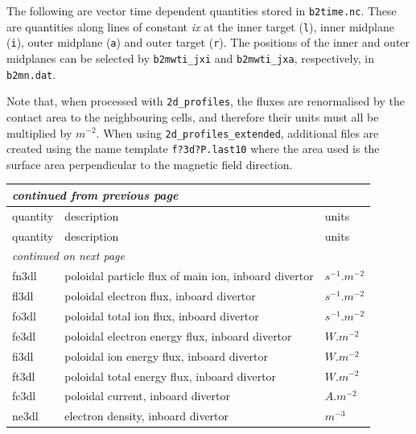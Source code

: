 \documentclass[a4paper,10pt]{report}
\begin{document}
The following are vector time dependent quantities stored in
{\tt b2time.nc}.  These are quantities along lines of constant
{\em ix} at the inner target ({\tt l}), inner midplane ({\tt i}),
outer midplane ({\tt a}) and outer target ({\tt r}).  The
positions of the inner and outer midplanes can be selected by
{\tt b2mwti\_jxi} and {\tt b2mwti\_jxa}, respectively, in
{\tt b2mn.dat}.

Note that, when processed with {\tt 2d\_profiles}, the fluxes are renormalised by the
contact area to the neighbouring cells, and therefore their units must all be multiplied
by $m^{-2}$. When using {\tt 2d\_profiles\_extended}, additional files are created using
the name template {\tt f?3d?P.last10} where the area used is the surface area
perpendicular to the magnetic field direction.

\begin{center}
    \begin{longtable}{|l|l|l|}
    \hline
    \multicolumn{3}{|l|}{\small\sl continued from previous page} \\
    \hline quantity & description & units \\
    \hline \endhead
    \hline quantity & description & units \\
    \hline \endfirsthead
    \hline
    \multicolumn{3}{|l|}{\small\sl continued on next page} \\
    \hline \endfoot
    \endlastfoot
fn3dl \index{fn3dl}\index{b2time.nc, fn3dl} & poloidal particle flux of main ion, inboard divertor & $s^{-1}.m^{-2}$ \\
fl3dl \index{fl3dl}\index{b2time.nc, fl3dl} & poloidal electron flux, inboard divertor & $s^{-1}.m^{-2}$ \\
fo3dl \index{fo3dl}\index{b2time.nc, fo3dl} & poloidal total ion flux, inboard divertor & $s^{-1}.m^{-2}$ \\
fe3dl \index{fe3dl}\index{b2time.nc, fe3dl} & poloidal electron energy flux, inboard divertor & $W.m^{-2}$ \\
fi3dl \index{fi3dl}\index{b2time.nc, fi3dl} & poloidal ion energy flux, inboard divertor & $W.m^{-2}$ \\
ft3dl \index{ft3dl}\index{b2time.nc, ft3dl} & poloidal total energy flux, inboard divertor & $W.m^{-2}$ \\
fc3dl \index{fc3dl}\index{b2time.nc, fc3dl} & poloidal current, inboard divertor  & $A.m^{-2}$ \\
ne3dl \index{ne3dl}\index{b2time.nc, ne3dl} & electron density, inboard divertor & $m^{-3}$ \\

\end{longtable}
\end{center}
\end{document}

